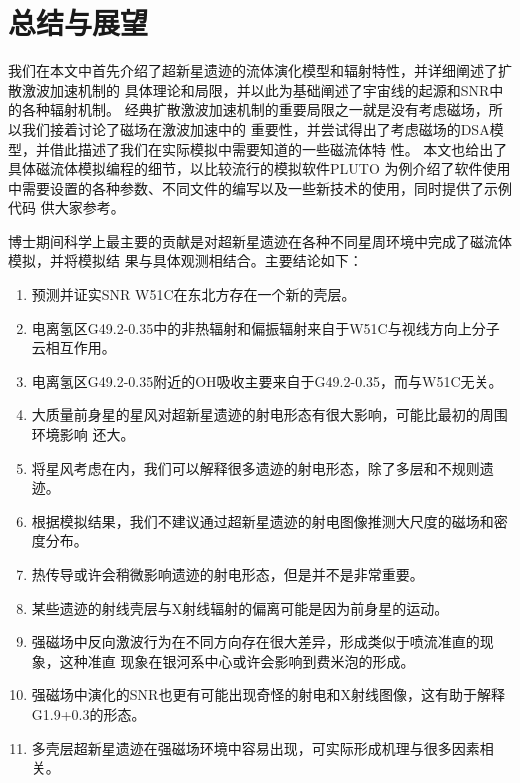 \chapter{总结与展望}
\label{Sum}

我们在本文中首先介绍了超新星遗迹的流体演化模型和辐射特性，并详细阐述了扩散激波加速机制的
具体理论和局限，并以此为基础阐述了宇宙线的起源和SNR中的各种辐射机制。
经典扩散激波加速机制的重要局限之一就是没有考虑磁场，所以我们接着讨论了磁场在激波加速中的
重要性，并尝试得出了考虑磁场的DSA模型，并借此描述了我们在实际模拟中需要知道的一些磁流体特
性。
本文也给出了具体磁流体模拟编程的细节，以比较流行的模拟软件PLUTO
为例介绍了软件使用中需要设置的各种参数、不同文件的编写以及一些新技术的使用，同时提供了示例代码
供大家参考。

博士期间科学上最主要的贡献是对超新星遗迹在各种不同星周环境中完成了磁流体模拟，并将模拟结
果与具体观测相结合。主要结论如下：

\begin{enumerate}

    \item 预测并证实SNR W51C在东北方存在一个新的壳层。

    \item 电离氢区G49.2-0.35中的非热辐射和偏振辐射来自于W51C与视线方向上分子云相互作用。

    \item 电离氢区G49.2-0.35附近的OH吸收主要来自于G49.2-0.35，而与W51C无关。

    \item 大质量前身星的星风对超新星遗迹的射电形态有很大影响，可能比最初的周围环境影响
    还大。

    \item 将星风考虑在内，我们可以解释很多遗迹的射电形态，除了多层和不规则遗迹。

    \item 根据模拟结果，我们不建议通过超新星遗迹的射电图像推测大尺度的磁场和密度分布。

    \item 热传导或许会稍微影响遗迹的射电形态，但是并不是非常重要。

    \item 某些遗迹的射线壳层与X射线辐射的偏离可能是因为前身星的运动。

    \item 强磁场中反向激波行为在不同方向存在很大差异，形成类似于喷流准直的现象，这种准直
    现象在银河系中心或许会影响到费米泡的形成。

    \item 强磁场中演化的SNR也更有可能出现奇怪的射电和X射线图像，这有助于解释
    G1.9+0.3的形态。

    \item 多壳层超新星遗迹在强磁场环境中容易出现，可实际形成机理与很多因素相关。

\end{enumerate}

